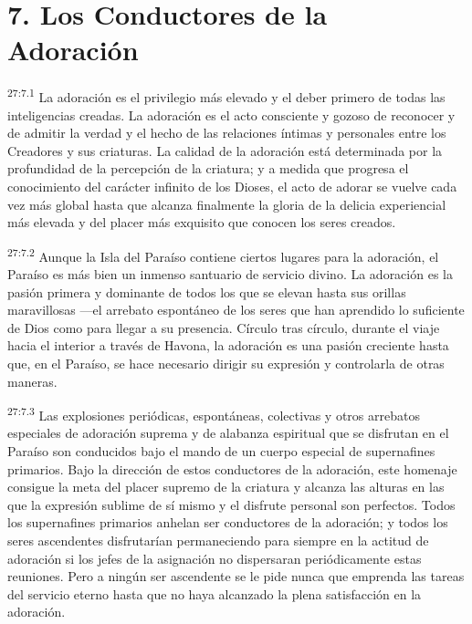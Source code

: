 \section*{7. Los Conductores de la Adoración}
\par
\textsuperscript{27:7.1} La adoración es el privilegio más elevado y el deber primero de todas las inteligencias creadas. La adoración es el acto consciente y gozoso de reconocer y de admitir la verdad y el hecho de las relaciones íntimas y personales entre los Creadores y sus criaturas. La calidad de la adoración está determinada por la profundidad de la percepción de la criatura; y a medida que progresa el conocimiento del carácter infinito de los Dioses, el acto de adorar se vuelve cada vez más global hasta que alcanza finalmente la gloria de la delicia experiencial más elevada y del placer más exquisito que conocen los seres creados.

\par
\textsuperscript{27:7.2} Aunque la Isla del Paraíso contiene ciertos lugares para la adoración, el Paraíso es más bien un inmenso santuario de servicio divino. La adoración es la pasión primera y dominante de todos los que se elevan hasta sus orillas maravillosas ---el arrebato espontáneo de los seres que han aprendido lo suficiente de Dios como para llegar a su presencia. Círculo tras círculo, durante el viaje hacia el interior a través de Havona, la adoración es una pasión creciente hasta que, en el Paraíso, se hace necesario dirigir su expresión y controlarla de otras maneras.

\par
\textsuperscript{27:7.3} Las explosiones periódicas, espontáneas, colectivas y otros arrebatos especiales de adoración suprema y de alabanza espiritual que se disfrutan en el Paraíso son conducidos bajo el mando de un cuerpo especial de supernafines primarios. Bajo la dirección de estos conductores de la adoración, este homenaje consigue la meta del placer supremo de la criatura y alcanza las alturas en las que la expresión sublime de sí mismo y el disfrute personal son perfectos. Todos los supernafines primarios anhelan ser conductores de la adoración; y todos los seres ascendentes disfrutarían permaneciendo para siempre en la actitud de adoración si los jefes de la asignación no dispersaran periódicamente estas reuniones. Pero a ningún ser ascendente se le pide nunca que emprenda las tareas del servicio eterno hasta que no haya alcanzado la plena satisfacción en la adoración.

